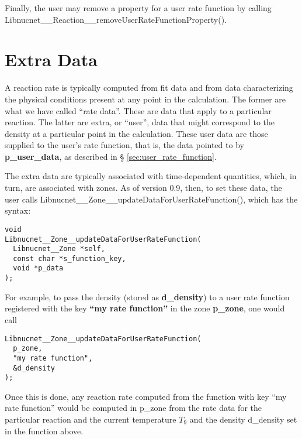 \documentclass{article}    %
\begin{document}
Finally, the user may remove a property for a user rate function by calling
Libnucnet\_\_Reaction\_\_removeUserRateFunctionProperty().

\section{Extra Data}

A reaction rate is typically computed from fit data and from data characterizing
the physical conditions present at any point in the calculation.  The former
are what we have called ``rate data''.  These are data that apply to a
particular reaction.  The latter are extra, or ``user'', data that might
correspond to the density at a particular point in the calculation.
These user data are those supplied to the user's rate function, that is,
the data pointed to by {\bf p\_user\_data}, as described in \S
\ref{sec:user_rate_function}.

The extra data are typically associated with time-dependent quantities,
which, in turn, are associated with zones.  As of version 0.9, then,
to set these data, the user calls
Libnucnet\_\_Zone\_\_updateDataForUserRateFunction(), which has the
syntax:
\begin{verbatim}
void
Libnucnet__Zone__updateDataForUserRateFunction(
  Libnucnet__Zone *self,
  const char *s_function_key,
  void *p_data
);
\end{verbatim}
For example, to pass the density (stored as {\bf d\_density}) to a
user rate function registered with the key {\bf ``my rate function''}
in the zone {\bf p\_zone}, one would call
\begin{verbatim}
Libnucnet__Zone__updateDataForUserRateFunction(
  p_zone,
  "my rate function",
  &d_density
);
\end{verbatim}
Once this is done, any reaction rate computed from the function with
key ``my rate function'' would be computed in p\_zone
from the rate data for
the particular reaction and the current temperature $T_9$ and the
density d\_density set in the function above.
\end{document}
